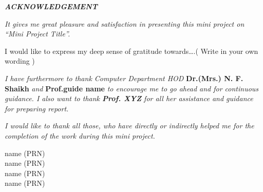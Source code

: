 \documentclass[a4paper, 12pt]{report}
\begin{document}
\begin{frontmatter}
\newpage
\begin{center}
{\Large{\bf{\textit{ACKNOWLEDGEMENT}}\\[2cm]}}
\end{center}
\par \textit{It gives me great pleasure and satisfaction in presenting this mini project on “Mini Project Title”.} \\
\par I would like to express my deep sense of gratitude towards….( Write in your own wording )\\
\par \textit{I have furthermore to thank Computer Department HOD}  {\bf Dr.(Mrs.) N. F. Shaikh} \textit{and} {\bf Prof.guide name} \textit{to encourage me to go ahead and for continuous guidance. I also want to thank {\bf Prof. XYZ} for all her assistance and guidance for preparing report.}\\
\par \textit{I would like to thank all those, who have directly or indirectly helped me for the completion of the work during this mini project.}
\vspace{0.8in}
\begin{flushright}
{name (PRN)}\\
{name (PRN)}\\
{name (PRN)}\\
{name (PRN)}\\
\hspace*{0.1in}{T.E. Computer}\\
\end{flushright}
\setcounter{page}{1}
\newpage
\tableofcontents
\listoffigures
\listoftables
{}
\begin{abstract}
\par The first line of the first paragraph under each heading should start from left-hand margins without indentation.  Text of abstract should be typed in Times New Roman, 12pt. Keywords should be written in Times New Roman, 12pt, Italic.\\
\par Text of chapters should be typed in Times Roman, 12pt font, normal. There should be 1 blank spaces gap between the subsequent sentences. For the Seminar report, the maximum length should not exceed 35 pages, exclusive of all figures, tables, captions, notes and references. 
\\
\vspace{0.3cm}

\textbf{Keywords-}\it{\textbf{Orientation Field Estimation, Enhanced Feedback, Minutiae, Fuzzy Feature Match(FFM).}}\\
\end{abstract}
\end{frontmatter}
\end{document}
